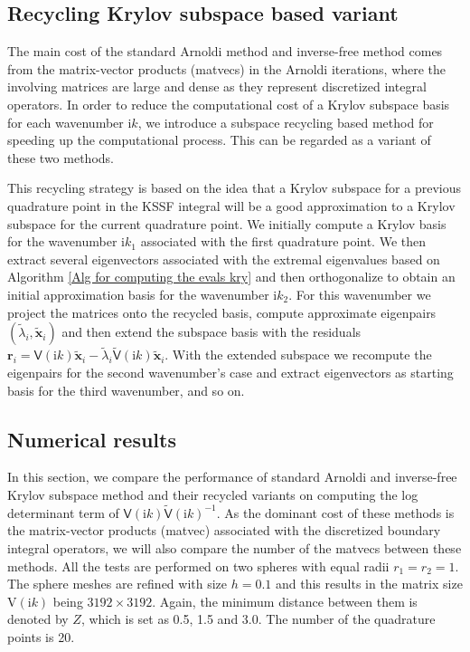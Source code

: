 \subsection{Recycling Krylov subspace based variant}

The main cost of the standard Arnoldi method and inverse-free method comes from the matrix-vector products (matvecs) in the Arnoldi iterations, where the 
involving matrices are large and dense as they represent discretized integral operators. In order to reduce the computational cost of a Krylov subspace basis 
for each wavenumber $\mathrm{i}k$, we introduce a subspace recycling based method for speeding up the computational process. This can be regarded 
as a variant of these two methods.

This recycling strategy is based on the idea that a Krylov subspace for a previous quadrature
point in the KSSF integral will be a good approximation to a Krylov subspace for the current quadrature point. We initially compute a Krylov basis for the wavenumber $\mathrm{i}k_{1}$ associated with the first
quadrature point. We then extract several eigenvectors associated with the extremal eigenvalues based on Algorithm \ref{Alg for computing the evals kry} and then orthogonalize to obtain an initial approximation
basis for the wavenumber $\mathrm{i}k_2$. For this wavenumber we project the matrices onto the recycled basis, compute approximate eigenpairs $(\tilde{\lambda}_i, \tilde{\mathbf{x}}_i)$ and then extend the subspace
basis with the residuals $\boldsymbol{r}_i = \mathsf{V}(\mathrm{i}k)\tilde{\boldsymbol{x}}_i - \tilde{\lambda}_i\tilde{\mathsf{V}}(\mathrm{i}k)\tilde{\boldsymbol{x}}_i$. With the extended subspace we recompute the eigenpairs for the second wavenumber's
case and extract eigenvectors as starting basis for the third wavenumber, and so on.

\subsection{Numerical results}
In this section, we compare the performance of standard Arnoldi and inverse-free Krylov subspace method and their recycled variants on computing the log 
determinant term of $\mathsf{V}(\mathrm{i}k)\tilde{\mathsf{V}}(\mathrm{i}k)^{-1}$. As the dominant cost of these methods is the matrix-vector products (matvec) 
associated with the discretized boundary integral operators, 
we will also compare the number of the matvecs between these methods. All the tests are performed on two spheres with equal radii $r_1 = r_2 = 1$. 
The sphere meshes are refined with size $h = 0.1$ and this results in the matrix size $\mathrm{V}(\mathrm{i}k)$ being $3192\times 3192$. Again, the minimum distance between them is denoted by $Z$, which is set as 0.5, 1.5 and 3.0. 
The number of the quadrature points is 20.

